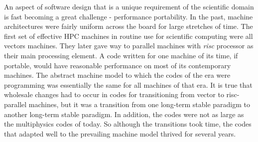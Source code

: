 \label{sec:future}

An aspect of software design that is a unique requirement of
the scientific domain is fast becoming a great challenge - performance
portability. In the past, machine architectures were fairly uniform
across the board for large stretches of time.  The first set of
effective HPC machines in routine use for scientific computing were
all vectors machines. They later gave way to parallel machines with
{\em risc} processor as their main processing element. A code written
for one machine of its time, if portable, would have reasonable
performance on most of its contemporary machines. The abstract machine
model to which the codes of the era were programming was essentially
the same for all machines of that era. It is true that wholesale changes had to occur
in codes for transitioning from vector to risc-parallel machines, but
it was a transition from one long-term stable paradigm to another
long-term stable paradigm.  In addition, the codes were not as large as the
multiphysics codes of today. So although the transitions took time, the
codes that adapted well to the prevailing machine model thrived for
several years.  


